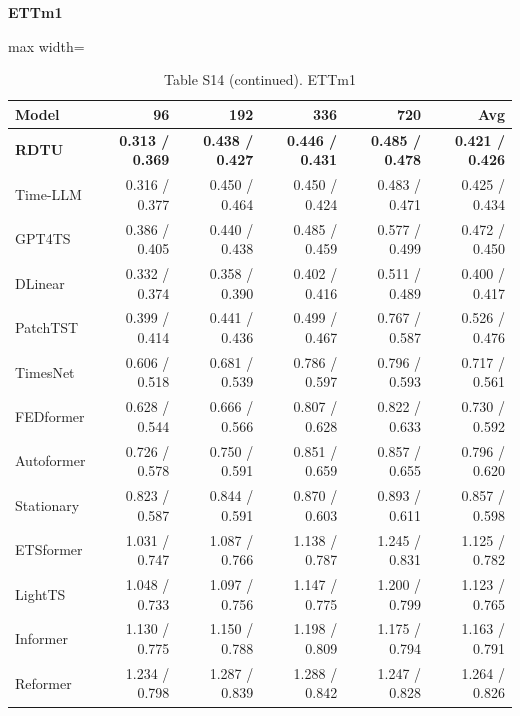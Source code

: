 \begin{table}[H]\centering\small
\caption*{Table S14 (continued). ETTm1}
\textbf{ETTm1}\par\smallskip
\begin{adjustbox}{max width=\linewidth}\begin{tabular}{lrrrrr}\toprule
\textbf{Model} & \textbf{96} & \textbf{192} & \textbf{336} & \textbf{720} & \textbf{Avg}\\\midrule
\rowcolor{blue!5}
\textbf{RDTU} & \textbf{0.313 / 0.369} & \textbf{0.438 / 0.427} & \textbf{0.446 / 0.431} & \textbf{0.485 / 0.478} & \textbf{0.421 / 0.426}\\
Time-LLM & 0.316 / 0.377 & 0.450 / 0.464 & 0.450 / 0.424 & 0.483 / 0.471 & 0.425 / 0.434\\
GPT4TS & 0.386 / 0.405 & 0.440 / 0.438 & 0.485 / 0.459 & 0.577 / 0.499 & 0.472 / 0.450\\
DLinear & 0.332 / 0.374 & 0.358 / 0.390 & 0.402 / 0.416 & 0.511 / 0.489 & 0.400 / 0.417\\
PatchTST & 0.399 / 0.414 & 0.441 / 0.436 & 0.499 / 0.467 & 0.767 / 0.587 & 0.526 / 0.476\\
TimesNet & 0.606 / 0.518 & 0.681 / 0.539 & 0.786 / 0.597 & 0.796 / 0.593 & 0.717 / 0.561\\
FEDformer & 0.628 / 0.544 & 0.666 / 0.566 & 0.807 / 0.628 & 0.822 / 0.633 & 0.730 / 0.592\\
Autoformer & 0.726 / 0.578 & 0.750 / 0.591 & 0.851 / 0.659 & 0.857 / 0.655 & 0.796 / 0.620\\
Stationary & 0.823 / 0.587 & 0.844 / 0.591 & 0.870 / 0.603 & 0.893 / 0.611 & 0.857 / 0.598\\
ETSformer & 1.031 / 0.747 & 1.087 / 0.766 & 1.138 / 0.787 & 1.245 / 0.831 & 1.125 / 0.782\\
LightTS & 1.048 / 0.733 & 1.097 / 0.756 & 1.147 / 0.775 & 1.200 / 0.799 & 1.123 / 0.765\\
Informer & 1.130 / 0.775 & 1.150 / 0.788 & 1.198 / 0.809 & 1.175 / 0.794 & 1.163 / 0.791\\
Reformer & 1.234 / 0.798 & 1.287 / 0.839 & 1.288 / 0.842 & 1.247 / 0.828 & 1.264 / 0.826\\
\bottomrule\end{tabular}\end{adjustbox}\end{table}
